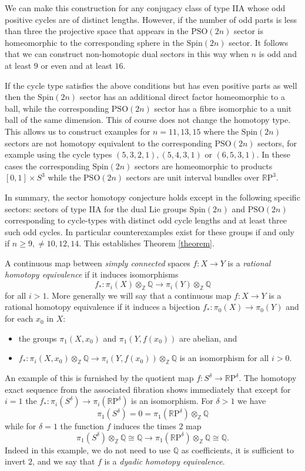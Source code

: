 \documentclass[11pt,a4paper]{article}
\def\Spin{\mathrm{Spin}}
\def\PSO{\mathrm{PSO}}
\def\R{\mathbb{R}}
\def\Z{\mathbb{Z}}
\def\Q{\mathbb{Q}}
\def\RP{\R\mathrm{P}}
\begin{document}
We can make this construction for any conjugacy class of type IIA whose odd positive cycles are of distinct lengths. However, if the number of odd parts is less than three the projective space that appears in the $\PSO(2n)$ sector is homeomorphic to  the corresponding sphere in the $\Spin(2n)$ sector. It follows that we can construct non-homotopic dual sectors in this way when $n$ is odd and at least $9$ or even and at least $16$.

If the cycle type satisfies the above conditions but has even positive parts as well then the $\Spin(2n)$ sector has an additional direct factor homeomorphic to a ball, while the corresponding $\PSO(2n)$ sector  has a fibre isomorphic to a unit ball  of the same dimension. This of course does not change the homotopy type. This allows us to construct examples for  $n=11,13,15$ where the $\Spin(2n)$ sectors are not homotopy equivalent to the corresponding $\PSO(2n)$ sectors, for example using the cycle types $(5,3,2,1), (5,4,3,1)$ or $(6,5,3,1)$. In these cases the corresponding $\Spin(2n)$ sectors are homeomorphic to products $[0,1]\times S^3$ while the $\PSO(2n)$ sectors are unit interval bundles over $\RP^3$.

In summary, the sector homotopy conjecture holds except in the following specific sectors: 
 sectors of type IIA for the dual Lie groups $\Spin(2n)$ and $\PSO(2n)$ corresponding to cycle-types with distinct odd cycle lengths and at least three such odd cycles.  In particular counterexamples exist for these groups if and only if $n\geq 9, \not=10,12,14$. This establishes Theorem \ref{theorem}.

\bigskip

A continuous map between \emph{simply connected} spaces $f:X\to Y$ is a \emph{rational homotopy equivalence} if it induces isomorphisms
\[
f_* :\pi_i(X)\otimes_\Z \Q\to \pi_i(Y)\otimes_\Z \Q
\]
for all $i>1$. More generally we will say that a continuous map $f:X\to Y$ is a rational homotopy equivalence if it induces a bijection $f_*:\pi_0(X)\to \pi_0(Y)$ and for each $x_0$ in $X$:
\begin{itemize}
    \item the groups $\pi_1(X,x_0)$ and $\pi_1(Y,f(x_0))$ are abelian, and
    \item $f_*:\pi_i(X,x_0)\otimes_\Z \Q\to \pi_i(Y,f(x_0))\otimes_\Z \Q$ is an isomorphism for all $i>0$.
\end{itemize}

An example of this is furnished by the quotient map $f: S^\delta\to \RP^\delta$. The homotopy exact sequence from the associated fibration shows immediately that except for $i=1$ the $f_*:\pi_i(S^\delta) \to \pi_i(\RP^\delta)$ is an isomorphism. For $\delta>1$ we have
\[
\pi_1(S^\delta)=0=\pi_1(\RP^\delta)\otimes_\Z \Q
\]
while for $\delta=1$ the function $f$ induces the times $2$ map
\[
\pi_1(S^\delta)\otimes_\Z\Q\cong \Q\to\pi_1(\RP^\delta)\otimes_\Z \Q\cong \Q.
\]
Indeed in this example, we do not need to use $\Q$ as coefficients, it is sufficient to invert $2$, and we say that $f$ is a \emph{dyadic homotopy equivalence}.
\end{document}
